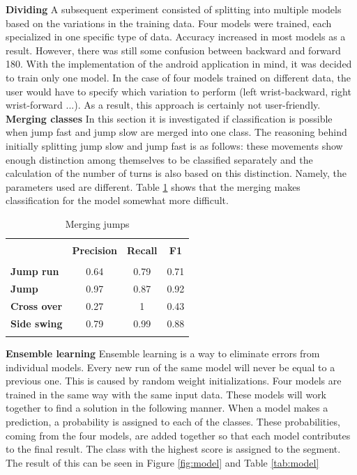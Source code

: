 \documentclass[twocolumn]{phdsymp} %
\begin{document}
\noindent\textbf{Dividing}\newline
A subsequent experiment consisted of splitting into multiple models based on the variations in the training data. Four models were trained, each specialized in one specific type of data. Accuracy increased in most models as a result. However, there was still some confusion between backward and forward 180.
With the implementation of the android application in mind, it was decided to train only one model. In the case of four models trained on different data, the user would have to specify which variation to perform (left wrist-backward, right wrist-forward ...). As a result, this approach is certainly not user-friendly. \\

\noindent\textbf{Merging classes}\newline
In this section it is investigated if classification is possible when jump fast and jump slow are merged into one class.
The reasoning behind initially splitting jump slow and jump fast is as follows: these movements show enough distinction among themselves to be classified separately and the calculation of the number of turns is also based on this distinction. Namely, the parameters used are different. Table \ref{tab:merging} shows that the merging makes classification for the model somewhat more difficult. \\

\begin{table}[!htpd]
  \centering
  \caption{Merging jumps}
  \label{tab:merging}
\begin{tabular}{lccc}
 \hline \\
\textbf{}             & \textbf{Precision} & \textbf{Recall} & \textbf{F1} &  \\
 \hline \\
\textbf{Jump run}  & 0.64               & 0.79            & 0.71        &  \\
\textbf{Jump}       & 0.97               & 0.87           & 0.92        &  \\
\textbf{Cross over}   & 0.27               & 1               & 0.43        &  \\
\textbf{Side swing}   & 0.79                  & 0.99           & 0.88        & \\
 \hline \\
\end{tabular}
\end{table}

\noindent\textbf{Ensemble learning}\newline
Ensemble learning is a way to eliminate errors from individual models. Every new run of the same model will never be equal to a previous one. This is caused by random weight initializations. Four models are trained in the same way with the same input data. These models will work together to find a solution in the following manner. When a model makes a prediction, a probability is assigned to each of the classes. These probabilities, coming from the four models, are added together so that each model contributes to the final result. The class with the highest score is assigned to the segment. The result of this can be seen in Figure \ref{fig:model} and Table \ref{tab:model} \\
\end{document}
